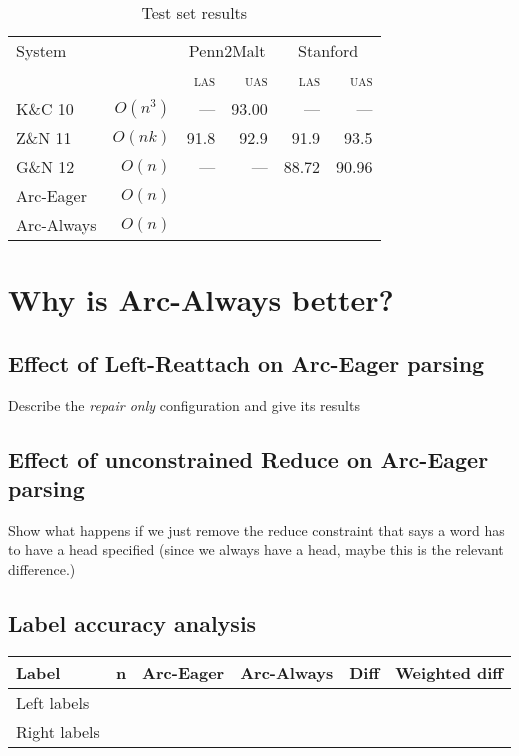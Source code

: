 \documentclass[11pt,letterpaper]{article}
\newcommand{\las}{\textsc{las}\xspace}
\newcommand{\uas}{\textsc{uas}\xspace}
\begin{document}
\begin{table}
    \centering
    \small
    \begin{tabular}{l|r|rr|rr}
        \hline 
System  &          & \multicolumn{2}{c|}{Penn2Malt} & \multicolumn{2}{c}{Stanford} \\
                           &          & \las  & \uas  & \las & \uas \\
        \hline \hline
K\&C 10  & $O(n^3)$ & ---   & 93.00 & ---  & --- \\
Z\&N 11  & $O(nk)$  & 91.8  & 92.9  & 91.9 & 93.5\\
G\&N 12  & $O(n)$   & ---   & ---   & 88.72 & 90.96 \\
        \hline
Arc-Eager  & $O(n)$ &       &       &       &  \\
Arc-Always & $O(n)$ &       &       &       &  \\
    \end{tabular}
    \caption{Test set results
         \label{tab:feats}}
\end{table}

\clearpage


\section{Why is Arc-Always better?}

\subsection{Effect of Left-Reattach on Arc-Eager parsing}

\pagebreak
Describe the \emph{repair only} configuration and give its results


\subsection{Effect of unconstrained Reduce on Arc-Eager parsing}

Show what happens if we just remove the reduce constraint that says a word has
to have a head specified (since we always have a head, maybe this is the relevant
difference.)


\pagebreak

\subsection{Label accuracy analysis}

\begin{table}
\centering
\small
\begin{tabular}{lr|rr|rr}
    Label        & n & Arc-Eager & Arc-Always & Diff & Weighted diff \\
    \hline \hline
    Left labels  &          &           &            &      &               \\
    \hline
    Right labels &          &          &            &      &               \\
\end{tabular}
\end{table}
\end{document}
